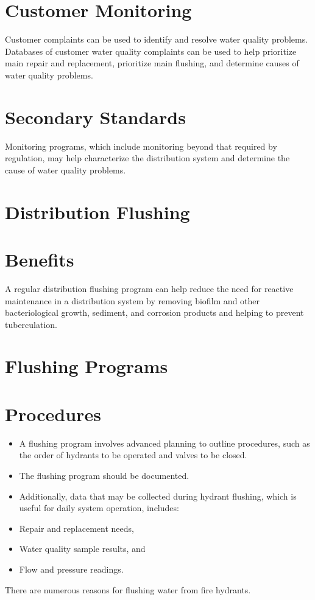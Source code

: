 \documentclass[10pt]{article}
\begin{document}
\section{Customer Monitoring}
Customer complaints can be used to identify and resolve water quality problems. Databases of customer water quality complaints can be used to help prioritize main repair and replacement, prioritize main flushing, and determine causes of water quality problems.

\section{Secondary Standards}
Monitoring programs, which include monitoring beyond that required by regulation, may help characterize the distribution system and determine the cause of water quality problems.

\section{Distribution Flushing}
\section{Benefits}
A regular distribution flushing program can help reduce the need for reactive maintenance in a distribution system by removing biofilm and other bacteriological growth, sediment, and corrosion products and helping to prevent tuberculation.

\section{Flushing Programs}
\section{Procedures}
\begin{itemize}
  \item A flushing program involves advanced planning to outline procedures, such as the order of hydrants to be operated and valves to be closed.

  \item The flushing program should be documented.

  \item Additionally, data that may be collected during hydrant flushing, which is useful for daily system operation, includes:

  \item Repair and replacement needs,

  \item Water quality sample results, and

  \item Flow and pressure readings.

\end{itemize}
There are numerous reasons for flushing water from fire hydrants.
\end{document}
